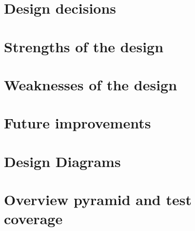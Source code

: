 \documentclass[a4paper,12pt]{article}
\begin{document}
\setlength\parindent{0pt}



\tableofcontents

\newpage

\section{Design decisions}


\section{Strengths of the design}


\section{Weaknesses of the design}


\section{Future improvements}


\section{Design Diagrams}


\section{Overview pyramid and test coverage}

\end{document}
